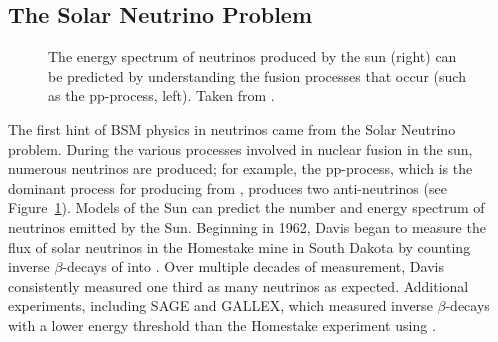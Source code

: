 \documentclass[/main.tex]{subfiles}
\begin{document}
\subsection{The Solar Neutrino Problem}
\begin{figure}[t]
  \centering
  \caption[Neutrinos produced by Solar fusion]{\label{fig:ppproc}
    The energy spectrum of neutrinos produced by the sun (right) can be predicted by understanding the fusion processes that occur (such as the pp-process, left). Taken from \cite{PDG2018}.
  }
\end{figure}
The first hint of BSM physics in neutrinos came from the Solar Neutrino problem.
During the various processes involved in nuclear fusion in the sun, numerous neutrinos are produced; for example, the pp-process, which is the dominant process for producing  from , produces two anti-neutrinos (see Figure~\ref{fig:ppproc}).
Models of the Sun can predict the number and energy spectrum of neutrinos emitted by the Sun\cite{Bahcall2005}.
Beginning in 1962, Davis began to measure the flux of solar neutrinos in the Homestake mine in South Dakota by counting inverse $\beta$-decays of  into .
Over multiple decades of measurement, Davis consistently measured one third as many neutrinos as expected\cite{Cleveland1998}.
Additional experiments, including SAGE and GALLEX, which measured inverse $\beta$-decays with a lower energy threshold than the Homestake experiment using \cite{SageGallex1999}.
\end{document}

